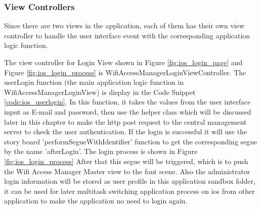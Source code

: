 \subsubsection{View Controllers}
\par Since there are two views in the application, each of them has their own view controller to handle the user interface event with the corresponding application logic function. 
\par The view controller for Login View shown in Figure \ref{fig:ios_login_page} and Figure \ref{fig:ios_login_process} is WifiAccessManagerLoginViewController. The userLogin function (the main application logic function in WifiAccessManagerLoginView) is display in the Code Snippet \ref{code:ios_userlogin}. In this function, it takes the values from the user interface input as E-mail and password, then use the helper class which will be discussed later in this chapter to make the \gls{http} post request to the central management server to check the user authentication. If the login is successful it will use the story board 'performSegueWithIdentifier' function to get the corresponding segue by the name 'afterLogin'. The login process is shown in Figure \ref{fig:ios_login_process} After that this segue will be triggered, which is to push the Wifi Access Manager Master view to the font scene. Also the administrator login information will be stored as user profile in this application sandbox folder, it can be used for later multitask switching application process on \gls{ios} from other application to make the application no need to login again.

